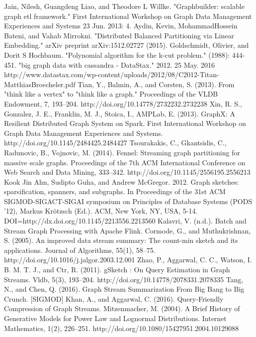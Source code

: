 \documentclass[12pt]{report}
\numberwithin{figure}{section}
\numberwithin{table}{section}
\begin{document}
\begin{thebibliography}{1}
   Jain, Nilesh, Guangdeng Liao, and Theodore L Willke. "Graphbuilder: scalable graph etl framework." First International Workshop on Graph Data Management Experiences and Systems 23 Jun. 2013: 4.
   Aydin, Kevin, MohammadHossein Bateni, and Vahab Mirrokni. "Distributed Balanced Partitioning via Linear Embedding." arXiv preprint arXiv:1512.02727 (2015).
   Goldschmidt, Olivier, and Dorit S Hochbaum. "Polynomial algorithm for the k-cut problem." (1988): 444-451.
   "big graph data with cassandra - DataStax." 2012. 25 May. 2016 http://www.datastax.com/wp-content/uploads/2012/08/C2012-Titan-MatthiasBroecheler.pdf
   Tian, Y., Balmin, A., and Corsten, S. (2013). From "think like a vertex" to "think like a graph." Proceedings of the VLDB Endowment, 7, 193–204. http://doi.org/10.14778/2732232.2732238
   Xin, R. S., Gonzalez, J. E., Franklin, M. J., Stoica, I.,  AMPLab, E. (2013). GraphX: A Resilient Distributed Graph System on Spark. First International Workshop on Graph Data Management Experiences and Systems. http://doi.org/10.1145/2484425.2484427
   Tsourakakis, C., Gkantsidis, C., Radunovic, B.,  Vojnovic, M. (2014). Fennel: Streaming graph partitioning for massive scale graphs. Proceedings of the 7th ACM International Conference on Web Search and Data Mining, 333–342. http://doi.org/10.1145/2556195.2556213
  Kook Jin Ahn, Sudipto Guha, and Andrew McGregor. 2012. Graph sketches: sparsification, spanners, and subgraphs. In Proceedings of the 31st ACM SIGMOD-SIGACT-SIGAI symposium on Principles of Database Systems (PODS '12), Markus Krötzsch (Ed.). ACM, New York, NY, USA, 5-14. DOI=http://dx.doi.org/10.1145/2213556.2213560
   Kalavri, V. (n.d.). Batch and Stream Graph Processing with Apache Flink.
   Cormode, G., and Muthukrishnan, S. (2005). An improved data stream summary: The count-min sketch and its applications. Journal of Algorithms, 55(1), 58–75. http://doi.org/10.1016/j.jalgor.2003.12.001
   Zhao, P., Aggarwal, C. C., Watson, I. B. M. T. J., and Ctr, R. (2011). gSketch : On Query Estimation in Graph Streams. Vldb, 5(3), 193–204. http://doi.org/10.14778/2078331.2078335
   Tang, N., and Chen, Q. (2016). Graph Stream Summarization From Big Bang to Big Crunch. [SIGMOD]
   Khan, A., and Aggarwal, C. (2016). Query-Friendly Compression of Graph Streams.
  Mitzenmacher, M. (2004). A Brief History of Generative Models for Power Law and Lognormal Distributions. Internet Mathematics, 1(2), 226–251. http://doi.org/10.1080/15427951.2004.10129088

\end{thebibliography}
\end{document}
